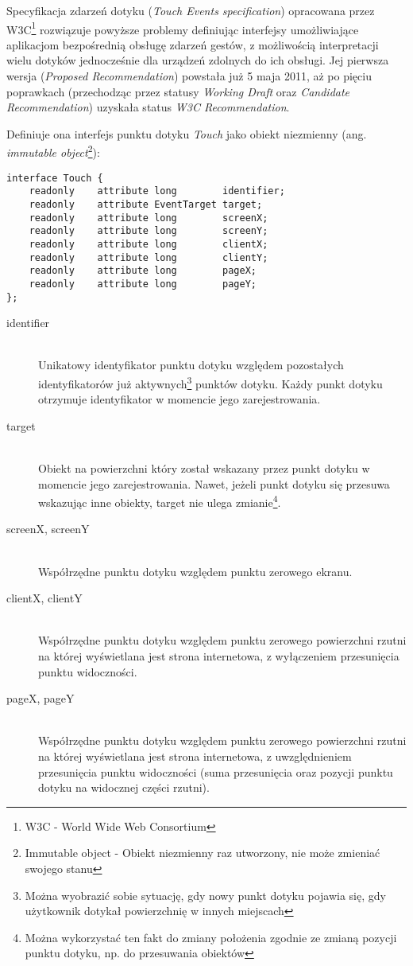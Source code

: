 Specyfikacja zdarzeń dotyku (\emph{Touch Events specification}\cite{touch-events-w3c}) opracowana przez W3C\footnote{W3C - World Wide Web Consortium} rozwiązuje powyższe problemy definiując interfejsy umożliwiające aplikacjom bezpośrednią obsługę zdarzeń gestów, z możliwością interpretacji wielu dotyków jednocześnie dla urządzeń zdolnych do ich obsługi. Jej pierwsza wersja (\emph{Proposed Recommendation}) powstała już 5 maja 2011, aż po pięciu poprawkach (przechodząc przez statusy \emph{Working Draft} oraz \emph{Candidate Recommendation}) uzyskała status \emph{W3C Recommendation}.

Definiuje ona interfejs punktu dotyku \emph{Touch} jako obiekt niezmienny (ang. \emph{immutable object}\footnote{Immutable object - Obiekt niezmienny raz utworzony, nie może zmieniać swojego stanu}):

\lstset{language=Octave}
\begin{lstlisting}
interface Touch {
    readonly    attribute long        identifier;
    readonly    attribute EventTarget target;
    readonly    attribute long        screenX;
    readonly    attribute long        screenY;
    readonly    attribute long        clientX;
    readonly    attribute long        clientY;
    readonly    attribute long        pageX;
    readonly    attribute long        pageY;
};
\end{lstlisting}

\begin{description}
  \item[identifier] \hfill \\
  Unikatowy identyfikator punktu dotyku względem pozostałych identyfikatorów już aktywnych\footnote{Można wyobrazić sobie sytuację, gdy nowy punkt dotyku pojawia się, gdy użytkownik dotykał powierzchnię w innych miejscach} punktów dotyku. Każdy punkt dotyku otrzymuje identyfikator w momencie jego zarejestrowania.
  \item[target] \hfill \\
  Obiekt na powierzchni który został wskazany przez punkt dotyku w momencie jego zarejestrowania. Nawet, jeżeli punkt dotyku się przesuwa wskazując inne obiekty, target nie ulega zmianie\footnote{Można wykorzystać ten fakt do zmiany położenia zgodnie ze zmianą pozycji punktu dotyku, np. do przesuwania obiektów}.
  \item[screenX, screenY] \hfill \\
  Współrzędne punktu dotyku względem punktu zerowego ekranu.
  \item[clientX, clientY] \hfill \\
  Współrzędne punktu dotyku względem punktu zerowego powierzchni rzutni na której wyświetlana jest strona internetowa, z wyłączeniem przesunięcia punktu widoczności.
  \item[pageX, pageY] \hfill \\
  Współrzędne punktu dotyku względem punktu zerowego powierzchni rzutni na której wyświetlana jest strona internetowa, z uwzględnieniem przesunięcia punktu widoczności (suma przesunięcia oraz pozycji punktu dotyku na widocznej części rzutni).
\end{description}

